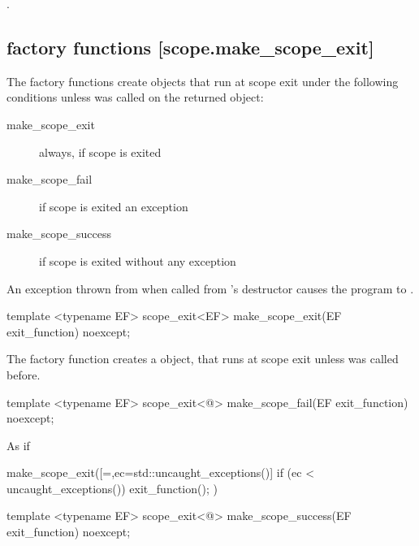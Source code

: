 \documentclass[ebook,11pt,article]{memoir}
\begin{document}
\begin{itemdescr}
\pnum
\effects {}.
\end{itemdescr}


\subsection { factory functions [scope.make_scope_exit]}
\pnum
The factory functions create  objects that run  at scope exit  under the following conditions unless  was called on the returned object:
\begin{description}
\item[make_scope_exit ] always, if scope is exited
\item[make_scope_fail ] if scope is exited an exception
\item[make_scope_success ] if scope is exited without any exception
\end{description}
\pnum
\enternote
An exception thrown from  when called from 's destructor causes the program to .
\exitnote

\begin{itemdecl}
template <typename EF>
scope_exit<EF> make_scope_exit(EF exit_function) noexcept;
\end{itemdecl}

\begin{itemdescr}
\pnum
The factory function creates a  object, that runs  at scope exit unless  was called before.

\end{itemdescr}

\begin{itemdecl}
template <typename EF>
scope_exit<@\seebelow@> make_scope_fail(EF exit_function) noexcept;
\end{itemdecl}

\begin{itemdescr}
\pnum
\returns As if
\begin{codeblock}
  make_scope_exit([=,ec=std::uncaught_exceptions()]
    {
      if (ec < uncaught_exceptions()) exit_function();
    })
\end{codeblock}
\end{itemdescr}
\begin{itemdecl}
template <typename EF>
scope_exit<@\seebelow@> make_scope_success(EF exit_function) noexcept;
\end{itemdecl}
\end{document}

